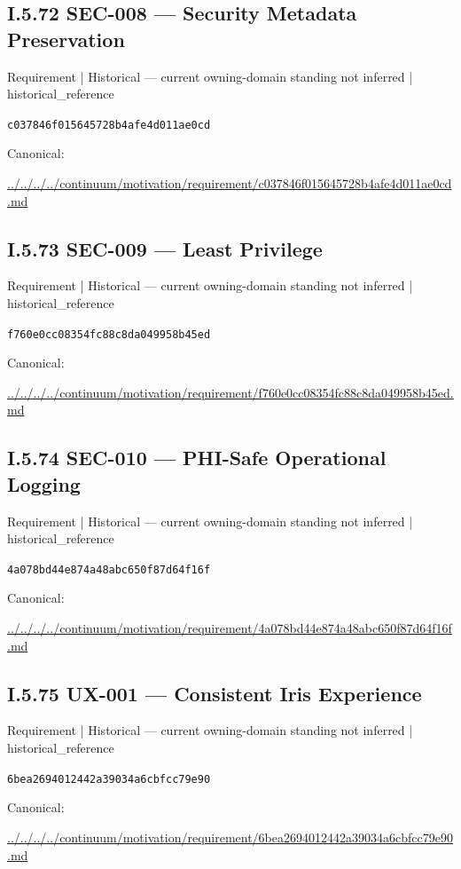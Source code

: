 \documentclass[10pt,a4paper]{article}
\begin{document}
\subsection*{I.5.72 SEC-008 — Security Metadata Preservation}
\label{element-c037846f015645728b4afe4d011ae0cd}
{\small Requirement | Historical — current owning-domain standing not inferred | historical\_reference}\par
\texttt{c037846f015645728b4afe4d011ae0cd}\par
Canonical: \par
{\footnotesize\url{../../../../continuum/motivation/requirement/c037846f015645728b4afe4d011ae0cd.md}}\par
\subsection*{I.5.73 SEC-009 — Least Privilege}
\label{element-f760e0cc08354fc88c8da049958b45ed}
{\small Requirement | Historical — current owning-domain standing not inferred | historical\_reference}\par
\texttt{f760e0cc08354fc88c8da049958b45ed}\par
Canonical: \par
{\footnotesize\url{../../../../continuum/motivation/requirement/f760e0cc08354fc88c8da049958b45ed.md}}\par
\subsection*{I.5.74 SEC-010 — PHI-Safe Operational Logging}
\label{element-4a078bd44e874a48abc650f87d64f16f}
{\small Requirement | Historical — current owning-domain standing not inferred | historical\_reference}\par
\texttt{4a078bd44e874a48abc650f87d64f16f}\par
Canonical: \par
{\footnotesize\url{../../../../continuum/motivation/requirement/4a078bd44e874a48abc650f87d64f16f.md}}\par
\subsection*{I.5.75 UX-001 — Consistent Iris Experience}
\label{element-6bea2694012442a39034a6cbfcc79e90}
{\small Requirement | Historical — current owning-domain standing not inferred | historical\_reference}\par
\texttt{6bea2694012442a39034a6cbfcc79e90}\par
Canonical: \par
{\footnotesize\url{../../../../continuum/motivation/requirement/6bea2694012442a39034a6cbfcc79e90.md}}\par
\end{document}
